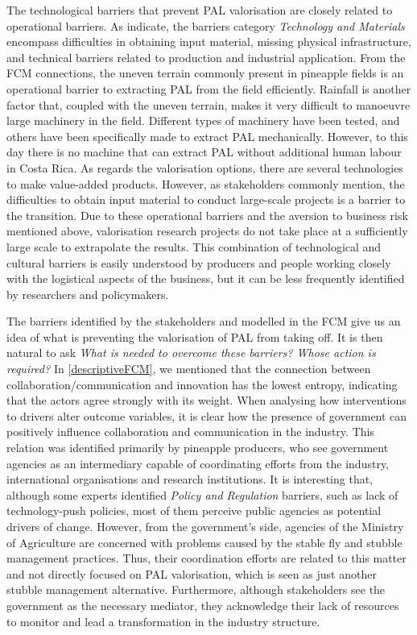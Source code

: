 The technological barriers that prevent PAL valorisation are closely related to operational barriers. As \cite{gottinger2020studying} indicate, the barriers category \textit{Technology and Materials} encompass difficulties in obtaining input material, missing physical infrastructure, and technical barriers related to production and industrial application. From the FCM connections, the uneven terrain commonly present in pineapple fields is an operational barrier to extracting PAL from the field efficiently. Rainfall is another factor that, coupled with the uneven terrain, makes it very difficult to manoeuvre large machinery in the field. Different types of machinery have been tested, and others have been specifically made to extract PAL mechanically. However, to this day there is no machine that can extract PAL without additional human labour in Costa Rica. As regards the valorisation options, there are several technologies to make value-added products. However, as stakeholders commonly mention, the difficulties to obtain input material to conduct large-scale projects is a barrier to the transition. Due to these operational barriers and the aversion to business risk mentioned above, valorisation research projects do not take place at a sufficiently large scale to extrapolate the results. This combination of technological and cultural barriers is easily understood by producers and people working closely with the logistical aspects of the business, but it can be less frequently identified by researchers and policymakers. 

The barriers identified by the stakeholders and modelled in the FCM give us an idea of what is preventing the valorisation of PAL from taking off. It is then natural to ask \textit{What is needed to overcome these barriers? Whose action is required?} In \cref{descriptiveFCM}, we mentioned that the connection between collaboration/communication and innovation has the lowest entropy, indicating that the actors agree strongly with its weight. When analysing how interventions to drivers alter outcome variables, it is clear how the presence of government can positively influence collaboration and communication in the industry. This relation was identified primarily by pineapple producers, who see government agencies as an intermediary capable of coordinating efforts from the industry, international organisations and research institutions. It is interesting that, although some experts identified \textit{Policy and Regulation} barriers, such as lack of technology-push policies, most of them perceive public agencies as potential drivers of change. However, from the government's side, agencies of the Ministry of Agriculture are concerned with problems caused by the stable fly and stubble management practices. Thus, their coordination efforts are related to this matter and not directly focused on PAL valorisation, which is seen as just another stubble management alternative. Furthermore, although stakeholders see the government as the necessary mediator, they acknowledge their lack of resources to monitor and lead a transformation in the industry structure. 

